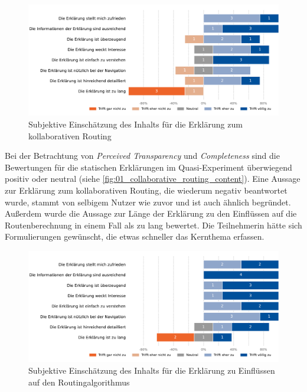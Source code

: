 \begin{figure}[htb!]
    \centering
    \includegraphics[width=\textwidth]{contents/06_model_evaluation/02_evaluation/res/qualitativeFeedback-01_collaborative_routing_content.pdf}
    \caption{Subjektive Einschätzung des Inhalts für die Erklärung zum kollaborativen Routing}
    \label{fig:01_collaborative_routing_content}
\end{figure}

Bei der Betrachtung von \textit{Perceived Transparency} und \textit{Completeness} sind die Bewertungen für die statischen Erklärungen im Quasi-Experiment überwiegend positiv oder neutral (siehe \autoref{fig:01_collaborative_routing_content}). Eine Aussage zur Erklärung zum kollaborativen Routing, die wiederum negativ beantwortet wurde, stammt von selbigem Nutzer wie zuvor und ist auch ähnlich begründet. Außerdem wurde die Aussage zur Länge der Erklärung zu den Einflüssen auf die Routenberechnung in einem Fall als zu lang bewertet. Die Teilnehmerin hätte sich Formulierungen gewünscht, die etwas schneller das Kernthema erfassen.

\begin{figure}[htb!]
    \centering
    \includegraphics[width=\textwidth]{contents/06_model_evaluation/02_evaluation/res/qualitativeFeedback-02_collaborative_algorithm_content.pdf}
    \caption{Subjektive Einschätzung des Inhalts für die Erklärung zu Einflüssen auf den Routingalgorithmus}
    \label{fig:02_collaborative_algorithm_content}
\end{figure}

